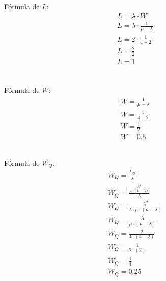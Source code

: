 \documentclass[12pt,a4paper]{article}
\begin{document}
Fórmula de \(L\):
\begin{equation*}
	\begin{aligned}
		&L = {\lambda} \cdot {W} \\
		&L = {\lambda} \cdot \frac{1}{\mu-\lambda} \\
		&L = {2} \cdot \frac{1}{4-2} \\
		&L = \frac{2}{2} \\
		&L = 1 \\
	\end{aligned}
\end{equation*}

\noindent
\\ 
Fórmula de \(W\):
\begin{equation*}
	\begin{aligned}
		&W = \frac{1}{\mu - \lambda} \\
		&W = \frac{1}{4 - 2} \\
		&W = \frac{1}{2} \\
		&W = {0.5} 
	\end{aligned}
\end{equation*}


\noindent
\\
Fórmula de \(W_Q\):
\begin{equation*}
	\begin{aligned}
		&W_Q = \frac{L_Q}{\lambda} \\
		&W_Q = \frac{\frac{\lambda^2}{\mu \cdot ({\mu - \lambda})}}{\lambda} \\
		&W_Q = \frac{\lambda^2}{\lambda \cdot \mu \cdot ({\mu - \lambda})} \\
		&W_Q = \frac{\lambda}{\mu \cdot ({\mu - \lambda})} \\
		&W_Q = \frac{2}{4 \cdot ({4 - 2})} \\
		&W_Q = \frac{1}{2 \cdot ({2})} \\
		&W_Q = \frac{1}{4} \\
		&W_Q = {0.25}
	\end{aligned}
\end{equation*}

\end{document}
